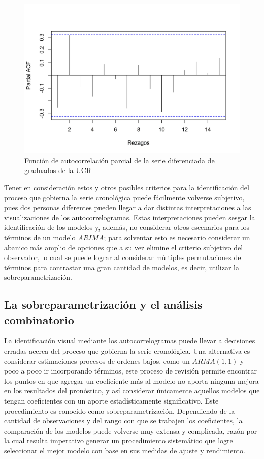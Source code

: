 \documentclass[
]{article}
\begin{document}
\begin{figure}[!h]
\includegraphics[width=1\linewidth,height=1\textheight]{Tesis_files/figure-latex/parcial_ucr2-1} \caption{Función de autocorrelación parcial de la serie diferenciada de graduados de la UCR}\label{fig:parcial_ucr2}
\end{figure}

Tener en consideración estos y otros posibles criterios para la
identificación del proceso que gobierna la serie cronológica puede
fácilmente volverse subjetivo, pues dos personas diferentes pueden
llegar a dar distintas interpretaciones a las visualizaciones de los
autocorrelogramas. Estas interpretaciones pueden sesgar la
identificación de los modelos y, además, no considerar otros escenarios
para los términos de un modelo \(ARIMA\); para solventar esto es
necesario considerar un abanico más amplio de opciones que a su vez
elimine el criterio subjetivo del observador, lo cual se puede lograr al
considerar múltiples permutaciones de términos para contrastar una gran
cantidad de modelos, es decir, utilizar la sobreparametrización.

\subsection{La sobreparametrización y el análisis combinatorio}

La identificación visual mediante los autocorrelogramas puede llevar a
decisiones erradas acerca del proceso que gobierna la serie cronológica.
Una alternativa es considerar estimaciones procesos de ordenes bajos,
como un \(ARMA(1,1)\) y poco a poco ir incorporando términos, este
proceso de revisión permite encontrar los puntos en que agregar un
coeficiente más al modelo no aporta ninguna mejora en los resultados del
pronóstico, y así considerar únicamente aquellos modelos que tengan
coeficientes con un aporte estadísticamente significativo. Este
procedimiento es conocido como sobreparametrización. Dependiendo de la
cantidad de observaciones y del rango con que se trabajen los
coeficientes, la comparación de los modelos puede volverse muy extensa y
complicada, razón por la cual resulta imperativo generar un
procedimiento sistemático que logre seleccionar el mejor modelo con base
en sus medidas de ajuste y rendimiento.
\end{document}
